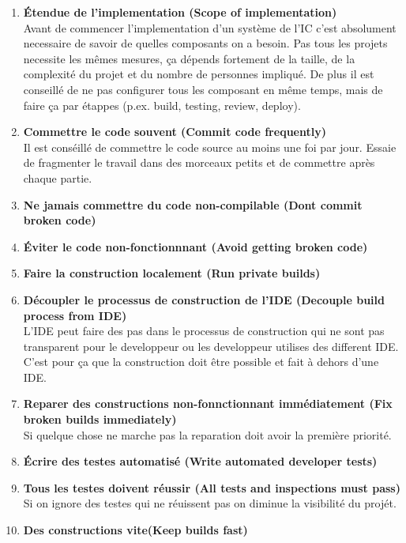 \begin{enumerate}

\item \textbf{Étendue de l'implementation (Scope of implementation)}\\
Avant de commencer l'implementation d'un système de l'IC c'est absolument necessaire de savoir de quelles composants on a besoin. Pas tous les projets necessite les mêmes mesures, ça dépends fortement de la taille, de la complexité du projet et du nombre de personnes impliqué. 
De plus il est conseillé de ne pas configurer tous les composant en même temps, mais de faire ça par étappes (p.ex. build, testing, review, deploy). 

\item\textbf{Commettre le code souvent (Commit code frequently)}\\
Il est conséillé de commettre le code source au moins une foi par jour. Essaie de fragmenter le travail dans des morceaux petits et de commettre après chaque partie.

\item\textbf{Ne jamais commettre du code non-compilable (Dont commit broken code)}

\item\textbf{Éviter le code non-fonctionnnant (Avoid getting broken code)}

\item\textbf{Faire la construction localement (Run private builds)}

\item\textbf{Découpler le processus de construction de l'IDE (Decouple build process from IDE)}\\
L'IDE peut faire des pas dans le processus de construction qui ne sont pas transparent pour le developpeur ou les developpeur utilises des different IDE. C'est pour ça que la construction doit être possible et fait à dehors d'une IDE.

\item\textbf{Reparer des constructions non-fonnctionnant immédiatement (Fix broken builds immediately)}\\
Si quelque chose ne marche pas la reparation doit avoir la première priorité.

\item\textbf{Écrire des testes automatisé (Write automated developer tests)}

\item\textbf{Tous les testes doivent réussir (All tests and inspections must pass)}\\
Si on ignore des testes qui ne réuissent pas on diminue la visibilité du projét.

\item\textbf{Des constructions vite(Keep builds fast)}\\

\end{enumerate}



